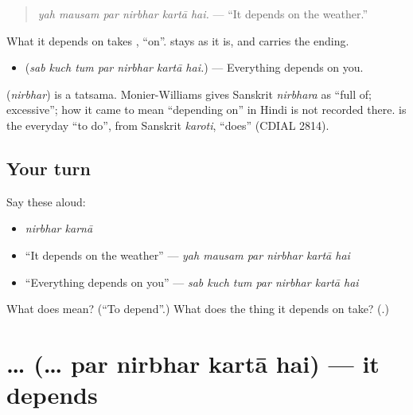 \begin{quote}
\emph{yah mausam par nirbhar kartā hai.} — \textquotedblleft{}It depends on the weather.\textquotedblright{}
\end{quote}

What it depends on takes \textbf{}, \textquotedblleft{}on\textquotedblright{}. \textbf{} stays as it is, and \textbf{} carries the ending.

\begin{itemize}
\raggedright
  \item \textbf{      } (\emph{sab kuch tum par nirbhar kartā hai.}) — Everything depends on you.
\end{itemize}

\begin{cousinweb}
\textbf{} (\emph{nirbhar}) is a tatsama. Monier-Williams gives Sanskrit \emph{nirbhara} as \textquotedblleft{}full of; excessive\textquotedblright{}; how it came to mean \textquotedblleft{}depending on\textquotedblright{} in Hindi is not recorded there. \textbf{} is the everyday \textquotedblleft{}to do\textquotedblright{}, from Sanskrit \emph{karoti}, \textquotedblleft{}does\textquotedblright{} (CDIAL 2814).
\end{cousinweb}

\subsection*{Your turn}
Say these aloud:

\begin{itemize}
\raggedright
  \item \emph{nirbhar karnā}
  \item \textquotedblleft{}It depends on the weather\textquotedblright{} — \emph{yah mausam par nirbhar kartā hai}
  \item \textquotedblleft{}Everything depends on you\textquotedblright{} — \emph{sab kuch tum par nirbhar kartā hai}
\end{itemize}

\begin{tcolorbox}[breakable,colback=teal!4,colframe=teal!35!black,title={Before you move on}]
What does \textbf{ } mean? (\textquotedblleft{}To depend\textquotedblright{}.) What does the thing it depends on take? (\textbf{}.)
\end{tcolorbox}
\section[\texorpdfstring{… \hi{पर} \hi{निर्भर} \hi{करता} \hi{है} (… par nirbhar …)}{… पर निर्भर करता है (… par nirbhar …)}]{…     (… par nirbhar kartā hai) — it depends}

